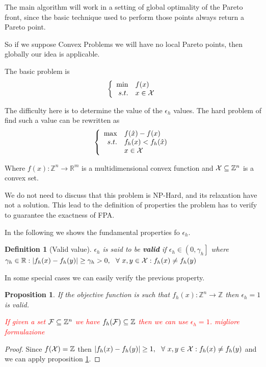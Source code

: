 \documentclass{article}
\newcommand{\red}[1]{\textcolor{red}{#1}}
\newtheorem{proposition}[theorem]{Proposition}
\newtheorem{definition}{Definition}
\def\setR{\mathbb{R}}
\def\setZ{\mathbb{Z}}
\def\setZn{\mathbb{Z}^n}
\def\X{{\cal X}}
\begin{document}
		The main algorithm will work in a setting of global optimality of the Pareto front, since the basic technique used to perform those points always return a Pareto point.
		
		So if we suppose Convex Problems we will have no local Pareto points, then globally our idea is applicable.
		
		The basic problem is
		$$
		\left\{
		\begin{array}{rl}
		\min & f(x) \\
		s.t.& x \in \X
		\end{array}
		\right.
		$$
		
		The difficulty here is to determine the value of the $\epsilon_h$ values. The hard problem of find such a value can be rewritten as
		$$
		\left\{
		\begin{array}{rl}
		\max & f(\hat{x})-f(x) \\
		s.t.& f_h(x) < f_h(\hat{x})\\
		& x \in \X
		\end{array}
		\right.
		$$
		
		Where $f(x): \setZn \rightarrow \setR^m$ is a multidimensional convex function and $\X \subseteq \setZn$ is a convex set.
		
		We do not need to discuss that this problem is NP-Hard, and its relaxation have not a solution. 
		This lead to the definition of properties  the problem has to verify to guarantee the exactness of FPA.
		
		In the following we shows the fundamental properties fo $\epsilon_h$.
		\begin{definition}[Valid value]\label{prop:gammah}
			$\epsilon_h $ is said to be \textbf{valid} if
			$\epsilon_h \in \left(0, \gamma_h \right]$ where $\gamma_h \in \setR : | f_h(x) - f_h(y) | \ge \gamma_h > 0, \ \ \forall \ x,y \in \X : f_h(x) \neq f_h(y) $
		\end{definition}
		
			In some special cases we can easily verify the previous property.
				
			
						
		
	
		\begin{proposition}\label{prop:suffcond}
			If the objective function is such that $ f_h(x):\setZn \rightarrow \setZ$ then $\epsilon_h = 1$ is valid.
			
			\red{ If given a set ${\cal F} \subseteq \setZn$ we have $ f_h({\cal F}) \subseteq \setZ$ then we can use $\epsilon_h = 1$. migliore formulazione}
		\end{proposition}
		\begin{proof}
			Since $f(\X) = \setZ$ then $ | f_h(x) - f_h(y) | \ge 1, \ \ \forall \ x,y \in \X : f_h(x) \neq f_h(y) $ and we can apply proposition \ref{prop:gammah}.
		\end{proof}
\end{document}
